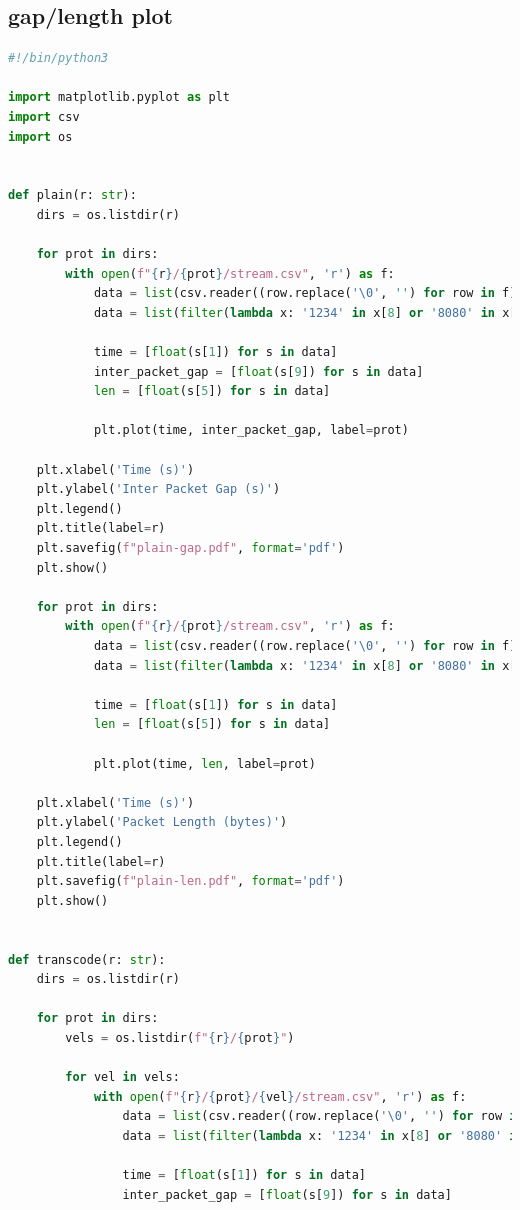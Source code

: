 \documentclass{exam}
\begin{document}
\subsection{gap/length plot}
\begin{lstlisting}[language=python]
#!/bin/python3

import matplotlib.pyplot as plt
import csv
import os


def plain(r: str):
    dirs = os.listdir(r)

    for prot in dirs:
        with open(f"{r}/{prot}/stream.csv", 'r') as f:
            data = list(csv.reader((row.replace('\0', '') for row in f), delimiter=','))
            data = list(filter(lambda x: '1234' in x[8] or '8080' in x[7], data[1:]))

            time = [float(s[1]) for s in data]
            inter_packet_gap = [float(s[9]) for s in data]
            len = [float(s[5]) for s in data]
            
            plt.plot(time, inter_packet_gap, label=prot)

    plt.xlabel('Time (s)')
    plt.ylabel('Inter Packet Gap (s)')
    plt.legend()
    plt.title(label=r)
    plt.savefig(f"plain-gap.pdf", format='pdf')
    plt.show()

    for prot in dirs:
        with open(f"{r}/{prot}/stream.csv", 'r') as f:
            data = list(csv.reader((row.replace('\0', '') for row in f), delimiter=','))
            data = list(filter(lambda x: '1234' in x[8] or '8080' in x[7], data[1:]))

            time = [float(s[1]) for s in data]
            len = [float(s[5]) for s in data]
            
            plt.plot(time, len, label=prot)

    plt.xlabel('Time (s)')
    plt.ylabel('Packet Length (bytes)')
    plt.legend()
    plt.title(label=r)
    plt.savefig(f"plain-len.pdf", format='pdf')
    plt.show()


def transcode(r: str):
    dirs = os.listdir(r)

    for prot in dirs:
        vels = os.listdir(f"{r}/{prot}")

        for vel in vels:
            with open(f"{r}/{prot}/{vel}/stream.csv", 'r') as f:
                data = list(csv.reader((row.replace('\0', '') for row in f), delimiter=','))
                data = list(filter(lambda x: '1234' in x[8] or '8080' in x[7], data[1:]))

                time = [float(s[1]) for s in data]
                inter_packet_gap = [float(s[9]) for s in data]
                

\end{lstlisting}
\end{document}
